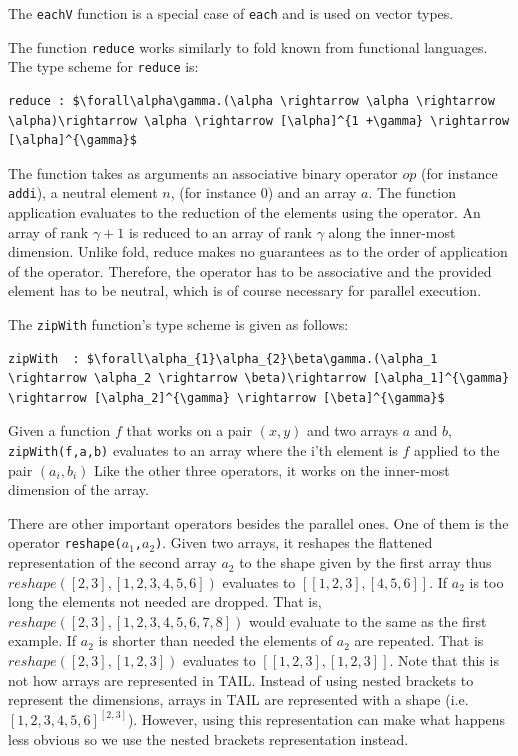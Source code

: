 \documentclass[11pt]{article}
\begin{document}
The {\tt eachV} function is a special case of {\tt each} and is used on vector types.

The function {\tt reduce} works similarly to fold known from functional languages. The type scheme for {\tt reduce} is:
\begin{lstlisting}[numbers=none,frame=none]
reduce : $\forall\alpha\gamma.(\alpha \rightarrow \alpha \rightarrow \alpha)\rightarrow \alpha \rightarrow [\alpha]^{1 +\gamma} \rightarrow [\alpha]^{\gamma}$
\end{lstlisting}
The function takes as arguments an associative binary operator $op$ (for instance {\tt addi}), a neutral element $n$, (for instance 0) and an array $a$.
The function application evaluates to the reduction of the elements using the operator.
An array of rank $\gamma+1$ is reduced to an array of rank $\gamma$ along the inner-most dimension.
Unlike fold, reduce makes no guarantees as to the order of application of the operator.
Therefore, the operator has to be associative and the provided element has to be neutral, which is of course necessary for parallel execution.

The {\tt zipWith} function's type scheme is given as follows: 
\begin{lstlisting}[numbers=none,frame=none]
zipWith  : $\forall\alpha_{1}\alpha_{2}\beta\gamma.(\alpha_1 \rightarrow \alpha_2 \rightarrow \beta)\rightarrow [\alpha_1]^{\gamma} \rightarrow [\alpha_2]^{\gamma} \rightarrow [\beta]^{\gamma}$
\end{lstlisting}
Given a function $f$ that works on a pair $(x,y)$ and two arrays $a$ and $b$, {\tt zipWith(f,a,b)}  evaluates to an array where the i'th element is $f$ applied to the pair $(a_i,b_i)$ 
Like the other three operators, it works on the inner-most dimension of the array\cite{ElsmanDybdal:Array:2014}.

There are other important operators besides the parallel ones. One of them is the operator {\tt reshape($a_1$,$a_2$)}.
Given two arrays, it reshapes the flattened representation of the second array $a_2$ to the shape given by the first array thus 
$reshape([2,3],[1,2,3,4,5,6])$ evaluates to $[[1,2,3],[4,5,6]]$. 
If $a_2$ is too long the elements not needed are dropped. That is, $reshape([2,3],[1,2,3,4,5,6,7,8])$ would evaluate to the same as the first example.
If $a_2$ is shorter than needed the elements of $a_2$ are repeated. That is $reshape([2,3],[1,2,3])$ evaluates to $[[1,2,3],[1,2,3]]$. Note that this is not how arrays are represented in TAIL. Instead of using nested brackets to represent the dimensions, arrays in TAIL are represented with a shape (i.e. $[1,2,3,4,5,6]^{[2,3]}$). However, using this representation can make what happens less obvious so we use the nested brackets representation instead. 
\end{document}
